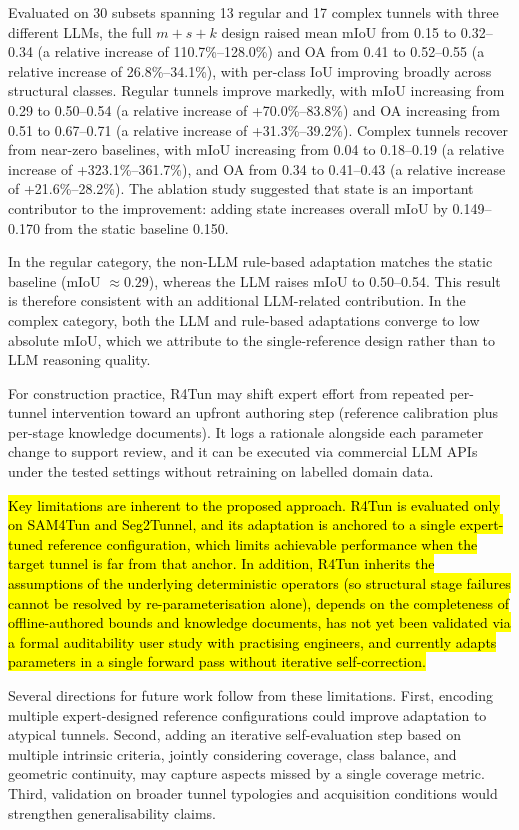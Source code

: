 \documentclass[a4paper,fleqn]{cas-dc}
\begin{document}
{Evaluated on 30 subsets spanning 13 regular and 17 complex tunnels with three different LLMs, the full \mbox{$m+s+k$}  design raised mean mIoU from 0.15 to 0.32--0.34 (a relative increase of 110.7\%--128.0\%) and OA from 0.41 to 0.52--0.55 (a relative increase of 26.8\%--34.1\%), with per-class IoU improving broadly across structural classes. Regular tunnels improve markedly, with mIoU increasing from 0.29 to 0.50--0.54 (a relative increase of +70.0\%--83.8\%) and OA increasing from 0.51 to 0.67--0.71 (a relative increase of +31.3\%--39.2\%). Complex tunnels recover from near-zero baselines, with mIoU increasing from 0.04 to 0.18--0.19 (a relative increase of +323.1\%--361.7\%), and OA from 0.34 to 0.41--0.43 (a relative increase of +21.6\%--28.2\%). The ablation study suggested that state is an important contributor to the improvement: adding state increases overall mIoU by 0.149--0.170 from the static baseline 0.150.

In the regular category, the non-LLM rule-based adaptation matches the static baseline (mIoU $\approx 0.29$), whereas the LLM raises mIoU to 0.50--0.54. This result is therefore consistent with an additional LLM-related contribution. In the complex category, both the LLM and rule-based adaptations converge to low absolute mIoU, which we attribute to the single-reference design rather than to LLM reasoning quality.

For construction practice, R4Tun may shift expert effort from repeated per-tunnel intervention toward an upfront authoring step (reference calibration plus per-stage knowledge documents). It logs a rationale alongside each parameter change to support review, and it can be executed via commercial LLM APIs under the tested settings without retraining on labelled domain data.

\hl{Key limitations are inherent to the proposed approach. R4Tun is evaluated only on SAM4Tun and Seg2Tunnel, and its adaptation is anchored to a single expert-tuned reference configuration, which limits achievable performance when the target tunnel is far from that anchor. In addition, R4Tun inherits the assumptions of the underlying deterministic operators (so structural stage failures cannot be resolved by re-parameterisation alone), depends on the completeness of offline-authored bounds and knowledge documents, has not yet been validated via a formal auditability user study with practising engineers, and currently adapts parameters in a single forward pass without iterative self-correction.}

Several directions for future work follow from these limitations. First, encoding multiple expert-designed reference configurations could improve adaptation to atypical tunnels. Second, adding an iterative self-evaluation step based on multiple intrinsic criteria, jointly considering coverage, class balance, and geometric continuity, may capture aspects missed by a single coverage metric. Third, validation on broader tunnel typologies and acquisition conditions would strengthen generalisability claims.

}
\end{document}
